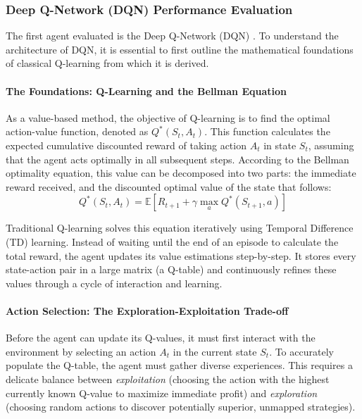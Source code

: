            \subsubsection{Deep Q-Network (DQN) Performance Evaluation}
                        
            The first agent evaluated is the Deep Q-Network (DQN) \cite{mnih2013playing}. To understand the architecture of DQN, it is essential to first outline the mathematical foundations of classical Q-learning from which it is derived. 
            
            \paragraph{The Foundations: Q-Learning and the Bellman Equation}
            As a value-based method, the objective of Q-learning is to find the optimal action-value function, denoted as $Q^*(S_t, A_t)$. This function calculates the expected cumulative discounted reward of taking action $A_t$ in state $S_t$, assuming that the agent acts optimally in all subsequent steps. According to the Bellman optimality equation, this value can be decomposed into two parts: the immediate reward received, and the discounted optimal value of the state that follows:
            \[
                Q^*(S_t, A_t) = \mathbb{E} \left[ R_{t+1} + \gamma \max_{a} Q^*(S_{t+1}, a) \right]
            \]
            
            Traditional Q-learning solves this equation iteratively using Temporal Difference (TD) learning. Instead of waiting until the end of an episode to calculate the total reward, the agent updates its value estimations step-by-step. It stores every state-action pair in a large matrix (a Q-table) and continuously refines these values through a cycle of interaction and learning.
            
            \paragraph{Action Selection: The Exploration-Exploitation Trade-off}
            Before the agent can update its Q-values, it must first interact with the environment by selecting an action $A_t$ in the current state $S_t$. To accurately populate the Q-table, the agent must gather diverse experiences. This requires a delicate balance between \textit{exploitation} (choosing the action with the highest currently known Q-value to maximize immediate profit) and \textit{exploration} (choosing random actions to discover potentially superior, unmapped strategies). 
            
